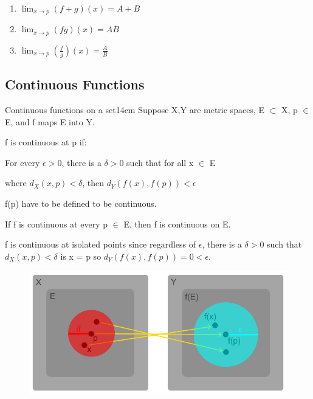     \begin{enumerate}[label=(\alph*), leftmargin=2cm, itemsep=0.1cm]
        \item $\lim_{x \rightarrow p} (f+g)(x) = A+B$
        \item $\lim_{x \rightarrow p} (fg)(x) = AB$
        \item $\lim_{x \rightarrow p} (\frac{f}{g})(x) = \frac{A}{B}$
    \end{enumerate}

    \newpage





\subsection{ Continuous Functions }

    \begin{definition}{Continuous functions on a set}{14cm}
        Suppose X,Y are metric spaces, E $\subset$ X, p $\in$ E, and
        f maps E into Y.

        f is continuous at p if:
        
        \begin{adjustbox}{minipage=13cm, right, vspace=0.1cm 0cm}
            For every $\epsilon > 0$, there is a
            $\delta > 0$ such that
            for all x $\in$ E
            
            where $d_X(x,p) < \delta$, then
            $d_Y(f(x),f(p)) < \epsilon$
        \end{adjustbox}

        f(p) have to be defined to be continuous.

        If f is continuous at every p $\in$ E, then f is continuous on E.

        f is continuous at isolated points since regardless of $\epsilon$,
        there is a $\delta > 0$ such that $d_X(x,p) < \delta$ is x = p so
        $d_Y(f(x),f(p)) = 0 < \epsilon$.
    \end{definition}



    \begin{figure}[h]
        \centering
        \includegraphics[scale=0.38]{Images/11.2.1.png}
    \end{figure}



